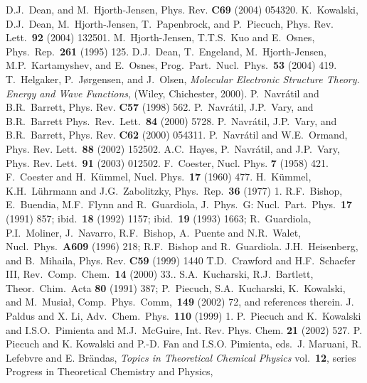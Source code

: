 \documentclass{ws-procs9x6}
\begin{document}
 \begin{thebibliography}{200}
 D.J.~Dean, and M.~Hjorth-Jensen, 
Phys. Rev. {\bf C69} (2004) 054320.
 K.~Kowalski, D.J.~Dean, M.~Hjorth-Jensen, T.~Papenbrock, 
and P.~Piecuch, Phys. Rev. Lett.~{\bf 92} (2004) 132501.
 M.\ Hjorth-Jensen, T.T.S.\ Kuo and E.\ Osnes,
Phys.\ Rep.\ {\bf 261} (1995) 125.
 D.J.~Dean, T.~Engeland, M.\ Hjorth-Jensen, M.P.~Kartamyshev, 
and E.\ Osnes, Prog.~Part.~Nucl.~Phys.~{\bf 53} (2004) 419.
 T.~Helgaker, P.~J{\o}rgensen, and J.~Olsen, 
 {\em Molecular Electronic Structure Theory. Energy and Wave Functions}, (Wiley, Chichester, 2000).
 P.~Navr\'atil and B.R.~Barrett, Phys. Rev. {\bf C57} (1998) 562.
 P.~Navr\'atil, J.P.~Vary, and B.R.~Barrett
Phys.~Rev.~Lett.~{\bf 84} (2000) 5728.
 P.~Navr\'atil, J.P.~Vary, and B.R.~Barrett, Phys. Rev. {\bf C62 }(2000) 054311.
 P.~Navr\'atil and W.E.~Ormand, Phys. Rev. Lett.~{\bf 88} (2002) 152502.
 A.C.~Hayes, P.~Navr\'atil, and J.P.~Vary,  Phys. Rev. Lett.~{\bf 91}
(2003)  012502.
 F.~Coester, Nucl. Phys. {\bf 7} (1958) 421.
 F.~Coester and H.~K\"ummel, Nucl. Phys.~{\bf 17} (1960) 477. H.\ K\"{u}mmel, K.H.\ L\"{u}hrmann and J.G.\ Zabolitzky, Phys.\ Rep.\
{\bf 36} (1977) 1.
 R.F.\ Bishop, E.\ Buendia, M.F.\ Flynn and R.\ Guardiola, J.\ Phys.\ G:
Nucl.\ Part.\ Phys.\ {\bf 17} (1991) 857; 
ibid.\ {\bf 18} (1992) 1157; 
ibid.\ {\bf 19} (1993) 1663; 
R.\ Guardiola, P.I.\ Moliner, J.\ Navarro, R.F.\ Bishop, A.\ Puente and
N.R.\ Walet, Nucl.\ Phys.\ {\bf A609} (1996) 218; R.F.\ Bishop and
R.\ Guardiola.
 J.H.~Heisenberg, and B.~Mihaila, Phys. Rev. {\bf C59} (1999) 1440 T.D.~Crawford and H.F.~Schaefer III,  Rev.~Comp.~Chem.~{\bf 14} (2000) 33..
\bibitem{Bartlett95} S.A.~Kucharski, R.J.~Bartlett, Theor.~Chim.~Acta {\bf 80} (1991) 387;
P.~Piecuch, S.A.~Kucharski, K.~Kowalski, and M.~Musia{\l},
Comp.~Phys.~Comm,~{\bf 149} (2002) 72, and references
therein. 
 J. Paldus and X. Li, Adv.~Chem.~Phys.~{\bf 110} (1999) 1.
\bibitem{Piecuch02a} P.~Piecuch and K.~Kowalski and I.S.O.~Pimienta and M.J.~McGuire,
 Int. Rev. Phys. Chem. {\bf 21} (2002) 527.
 P. Piecuch and K. Kowalski and P.-D. Fan and I.S.O. Pimienta,
eds.~J. Maruani, R. Lefebvre and E. Br{\"a}ndas,
{\em Topics in Theoretical Chemical Physics} vol.~{\bf 12},
     series     Progress in Theoretical Chemistry and Physics,

\end{thebibliography}
\end{document}
